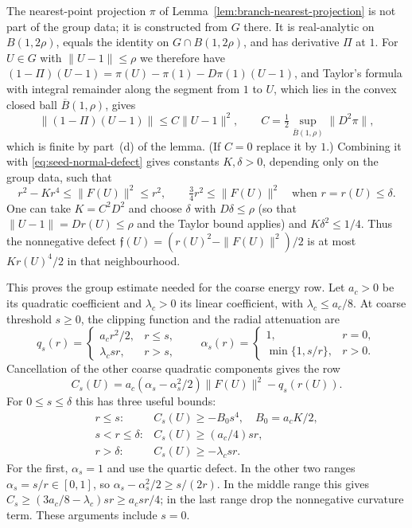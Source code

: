 The nearest-point projection $\pi$ of
Lemma~\ref{lem:branch-nearest-projection} is not part of the group
data; it is constructed from $G$ there. It is real-analytic on
$B(1,2\rho)$, equals the identity on $G\cap B(1,2\rho)$, and has
derivative $\Pi$ at $1$. For $U\in G$ with $\|U-1\|\le\rho$ we
therefore have
$(1-\Pi)(U-1)=\pi(U)-\pi(1)-D\pi(1)(U-1)$, and Taylor's formula
with integral remainder along the segment from $1$ to $U$, which lies
in the convex closed ball $\overline B(1,\rho)$, gives
\[
 \|(1-\Pi)(U-1)\|\le C\|U-1\|^2,\qquad
 C=\tfrac12\sup_{\overline B(1,\rho)}\|D^2\pi\|,
\]
which is finite by part~(d) of the lemma. (If $C=0$ replace it by
$1$.) Combining it with
\eqref{eq:seed-normal-defect} gives constants $K,\delta>0$, depending
only on the group data, such that
\begin{equation}\label{eq:seed-curvature-bound}
 r^2-Kr^4\le\|F(U)\|^2\le r^2,
 \qquad \tfrac34r^2\le\|F(U)\|^2
 \quad\text{when }r=r(U)\le\delta.
\end{equation}
One can take $K=C^2D^2$ and choose $\delta$ with $D\delta\le\rho$
(so that $\|U-1\|=Dr(U)\le\rho$ and the Taylor bound applies) and
$K\delta^2\le1/4$.
Thus the nonnegative defect
$\mathfrak f(U)=(r(U)^2-\|F(U)\|^2)/2$ is at most $Kr(U)^4/2$
in that neighbourhood.

This proves the group estimate needed for the coarse energy row.
Let $a_c>0$ be its quadratic coefficient and $\lambda_c>0$ its linear
coefficient, with $\lambda_c\le a_c/8$. At coarse threshold $s\ge0$,
the clipping function and the radial attenuation are
\[
 q_s(r)=\begin{cases}a_c r^2/2,&r\le s,\\\lambda_c sr,&r>s,\end{cases}
 \qquad
 \alpha_s(r)=\begin{cases}1,&r=0,\\\min\{1,s/r\},&r>0.\end{cases}
\]
Cancellation of the other coarse quadratic components gives the row
\begin{equation}\label{eq:seed-coarse-row}
 C_s(U)=a_c(\alpha_s-\alpha_s^2/2)\|F(U)\|^2-q_s(r(U)).
\end{equation}
For $0\le s\le\delta$ this has three useful bounds:
\begin{equation}\label{eq:seed-three-ranges}
 \begin{array}{ll}
 r\le s:& C_s(U)\ge-B_0s^4,\quad B_0=a_cK/2,\\
 s<r\le\delta:&C_s(U)\ge(a_c/4)sr,\\
 r>\delta:&C_s(U)\ge-\lambda_c sr.
 \end{array}
\end{equation}
For the first, $\alpha_s=1$ and use the quartic defect. In the other
two ranges $\alpha_s=s/r\in[0,1]$, so
$\alpha_s-\alpha_s^2/2\ge s/(2r)$. In the middle range this gives
$C_s\ge(3a_c/8-\lambda_c)sr\ge a_csr/4$; in the last range drop the
nonnegative curvature term. These arguments include $s=0$.

